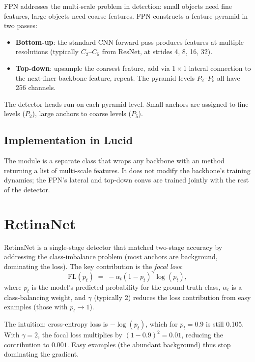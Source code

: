 FPN \cite{lin_fpn_2017} addresses the multi-scale problem in
detection: small objects need fine features, large objects need
coarse features. FPN constructs a feature pyramid in two passes:

\begin{itemize}
  \item \textbf{Bottom-up}: the standard CNN forward pass
    produces features at multiple resolutions (typically
    $C_2$--$C_5$ from ResNet, at strides 4, 8, 16, 32).
  \item \textbf{Top-down}: upsample the coarsest feature, add
    via $1 \times 1$ lateral connection to the next-finer
    backbone feature, repeat. The pyramid levels
    $P_2$--$P_5$ all have 256 channels.
\end{itemize}

The detector heads run on each pyramid level. Small anchors are
assigned to fine levels ($P_2$), large anchors to coarse
levels ($P_5$).

\subsection{Implementation in Lucid}
\label{ssec:detection_segmentation:fpn_impl}

The  module is a separate
class that wraps any backbone with an 
method returning a list of multi-scale features. It does not
modify the backbone's training dynamics; the FPN's lateral and
top-down convs are trained jointly with the rest of the
detector.

\section{RetinaNet}
\label{sec:detection_segmentation:retinanet}

RetinaNet \cite{lin_focal_2017} is a single-stage detector that
matched two-stage accuracy by addressing the class-imbalance
problem (most anchors are background, dominating the loss).
The key contribution is the \emph{focal loss}:
\[
  \mathrm{FL}(p_t) \;=\; -\alpha_t (1 - p_t)^\gamma \log(p_t),
\]
where $p_t$ is the model's predicted probability for the
ground-truth class, $\alpha_t$ is a class-balancing weight, and
$\gamma$ (typically 2) reduces the loss contribution from easy
examples (those with $p_t \to 1$).

The intuition: cross-entropy loss is $-\log(p_t)$, which for
$p_t = 0.9$ is still 0.105. With $\gamma = 2$, the focal loss
multiplies by $(1 - 0.9)^2 = 0.01$, reducing the contribution to
$0.001$. Easy examples (the abundant background) thus stop
dominating the gradient.

